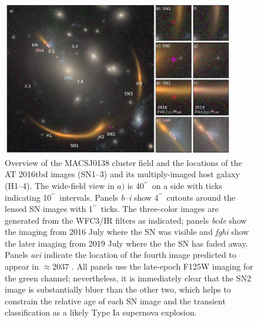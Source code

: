 \documentclass[12pt]{article}
\gdef\arcsec{$^{\prime\prime}$}
\def\SNABC{AT 2016tbd\xspace}
\begin{document}
\clearpage
\begin{figure}
    \centering
    \includegraphics[draft=False,width=0.9\textwidth]{Paper/Figures/fig1_layout.pdf}
    \caption{Overview of the MACSJ0138 cluster field and the locations of the \SNABC images  (SN1--3) and its multiply-imaged host galaxy (H1--4). The wide-field view in $a)$ is 40\arcsec\ on a side with ticks indicating 10\arcsec\ intervals.  
    Panels \emph{b}--\emph{i} show 4\arcsec\ cutouts around the lensed SN images with 1\arcsec\ ticks.  The three-color images are generated from the WFC3/IR filters as indicated; panels \emph{bcde} show the imaging from 2016 July where the SN was visible and \emph{fghi} show the later imaging from 2019 July where the the SN has faded away.  Panels \emph{aei} indicate the location of the fourth image predicted to appear in $\approx$2037 . All panels use the late-epoch F125W imaging for the green channel; nevertheless, it is immediately clear that the SN2 image is substantially bluer than the other two, which helps to constrain the relative age of each SN image and the transient classification as a likely Type Ia supernova explosion. }
    \label{fig:layout}
\end{figure}
\end{document}
